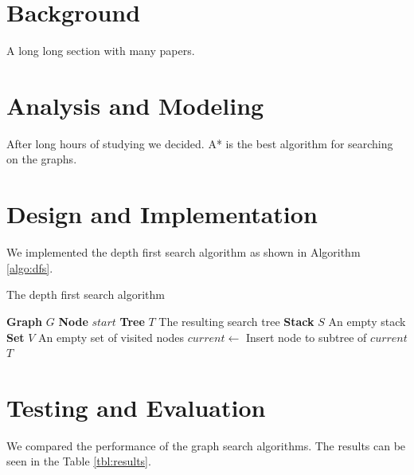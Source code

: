 \documentclass[a4paper, 12pt, titlepage]{article}
\begin{document}
\newpage
\section{Background}
A long long section with many papers.

\newpage
\section{Analysis and Modeling}
After long hours of studying we decided. A* is the best algorithm for searching on the graphs.

\newpage
\section{Design and Implementation}
We implemented the depth first search algorithm as shown in Algorithm \ref{algo:dfs}.
\begin{algorithm}[H]
    \caption{The depth first search algorithm}
    \label{algo:dfs}
    \begin{algorithmic}[1]
        \State \textbf{Graph} $G$
        \State \textbf{Node} $start$
        \State \textbf{Tree} $ T $ \Comment The resulting search tree
        \State \textbf{Stack} $ S $ \Comment An empty stack
        \State \textbf{Set} $ V $ \Comment An empty set of visited nodes
        \State {}
        \State {}
        \State $current \gets$ 
        \State {}
        \State {}
        \State {}
        \Comment Insert node to subtree of $ current $
        \EndFor
        \EndIf
        \EndWhile
        \State \Return $ T $
        \EndFunction
    \end{algorithmic}
\end{algorithm}

\newpage
\section{Testing and Evaluation}
We compared the performance of the graph search algorithms. The results can be seen in the Table \ref{tbl:results}.
\end{document}
